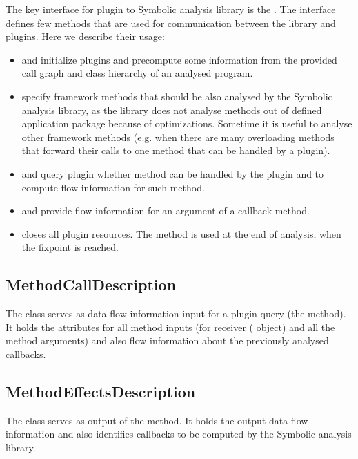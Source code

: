 The key interface for plugin to Symbolic analysis library is the .
The interface defines few methods that are used for communication between the library and plugins.
Here we describe their usage:
\begin{itemize}
  \item {} and  initialize plugins
    and precompute some information from the provided call graph and class hierarchy
    of an analysed program.
  \item {} specify framework methods that should
    be also analysed by the Symbolic analysis library, as the library does not
    analyse methods out of defined application package because of optimizations.
    Sometime it is useful to analyse other framework methods
    (e.g. when there are many overloading methods that forward their calls to one method
    that can be handled by a plugin).
  \item {} and  query plugin whether method can be
    handled by the plugin and to compute flow information for such method.
  \item {} and  provide flow information for
    an argument of a callback method.
  \item {} closes all plugin resources. The method is used at the end of analysis,
    when the fixpoint is reached.
\end{itemize}




\subsection{MethodCallDescription}

The class  serves as data flow information input for a plugin query
(the  method).
It holds the attributes for all method inputs
(for receiver ( object) and all the method arguments)
and also flow information about the previously analysed callbacks.




\subsection{MethodEffectsDescription}

The class  serves as output of the
 method. It holds the output data flow information
and also identifies callbacks to be computed by the Symbolic analysis library.

